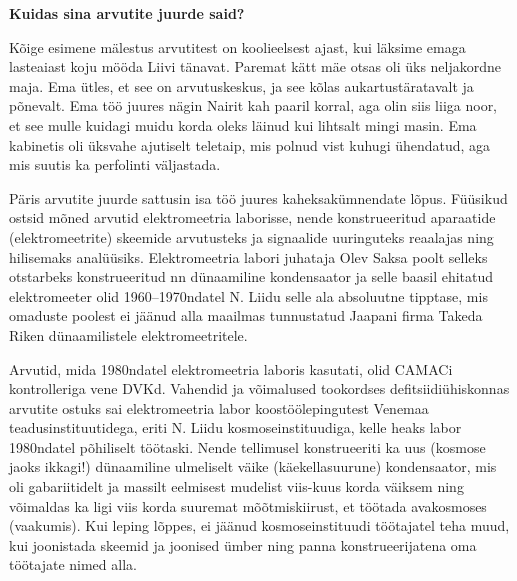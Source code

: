 \label{sisu:mroos}
\textbf{Kuidas sina arvutite juurde said?}

Kõige esimene mälestus arvutitest on koolieelsest ajast, kui
läksime emaga lasteaiast koju mööda Liivi tänavat. Paremat kätt mäe
otsas oli üks neljakordne maja. Ema ütles, et see on arvutuskeskus, ja see
kõlas aukartustäratavalt ja põnevalt. Ema töö juures nägin Nairit kah paaril
korral, aga olin siis liiga noor, et see mulle kuidagi muidu korda oleks
läinud kui lihtsalt mingi masin. Ema kabinetis oli üksvahe ajutiselt teletaip,
mis polnud vist kuhugi ühendatud, aga mis suutis ka perfolinti väljastada.

Päris arvutite juurde sattusin isa töö juures kaheksakümnendate lõpus. Füüsikud
ostsid mõned arvutid elektromeetria laborisse, nende konstrueeritud
aparaatide (elektromeetrite) skeemide arvutusteks ja signaalide uuringuteks reaalajas ning
hilisemaks analüüsiks. Elektromeetria labori juhataja Olev
Saksa poolt selleks otstarbeks konstrueeritud nn
dünaamiline kondensaator ja selle baasil ehitatud elektromeeter olid
1960--1970ndatel N. Liidu selle ala absoluutne tipptase, mis omaduste
poolest ei jäänud alla maailmas tunnustatud Jaapani firma Takeda Riken
dünaamilistele elektromeetritele.

Arvutid, mida 1980ndatel elektromeetria laboris kasutati, olid
CAMACi kontrolleriga vene
DVKd.
Vahendid ja võimalused tookordses defitsiidiühiskonnas arvutite ostuks sai
elektromeetria labor koostöölepingutest Venemaa teadusinstituutidega, eriti N.
Liidu kosmoseinstituudiga, kelle heaks labor 1980ndatel põhiliselt töötaski.
Nende tellimusel konstrueeriti ka uus (kosmose jaoks ikkagi!) dünaamiline
ulmeliselt väike (käekellasuurune) kondensaator, mis oli gabariitidelt ja
massilt eelmisest mudelist viis-kuus korda väiksem ning võimaldas ka ligi viis korda
suuremat mõõtmiskiirust, et töötada avakosmoses (vaakumis). Kui
leping lõppes, ei jäänud kosmoseinstituudi töötajatel teha muud, kui joonistada
skeemid ja joonised ümber ning panna konstrueerijatena oma töötajate nimed alla.

